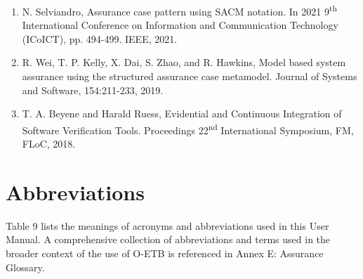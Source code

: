 \documentclass[12pt,twoside,a4paper]{article}
\begin{document}
\begin{enumerate}
\item
  N. Selviandro, Assurance case pattern using SACM notation. In 2021 9\textsuperscript{th} International Conference on Information and Communication Technology (ICoICT), pp. 494-499. IEEE, 2021.
\item
  R. Wei, T. P. Kelly, X. Dai, S. Zhao, and R. Hawkins, Model based system assurance using the structured assurance case metamodel. Journal of Systems and Software, 154:211-233, 2019.
\item
  T. A. Beyene and Harald Ruess, Evidential and Continuous Integration of Software Verification Tools. Proceedings 22\textsuperscript{nd} International Symposium, FM, FLoC, 2018.
\end{enumerate}

\clearpage
\hypertarget{abbreviations}{%
\section{Abbreviations}\label{abbreviations}}

Table 9 lists the meanings of acronyms and abbreviations used in this User Manual. A comprehensive collection of abbreviations and terms used in the broader context of the use of O-ETB is referenced in Annex E: Assurance Glossary.
\end{document}
